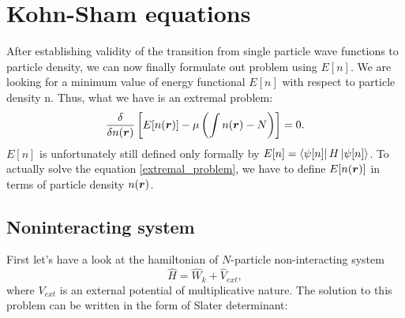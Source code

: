 \documentclass[openany, longbibliography,slovene,a4paper,12pt]{article}
\def\vec#1{\mbox{\boldmath$#1$}}
\begin{document}
  \section{Kohn-Sham equations}
After establishing validity of the transition from single particle wave functions
to particle density, we can now finally formulate out problem using $E[n]$. We
are looking for a minimum value of energy functional $E[n]$ with respect to particle
density n. Thus, what we have is an extremal problem: 
\begin{equation} \label{extremal_problem}
  \frac{\delta }{\delta n(\vec r)} \left[  E[n(\vec r)] - \mu \left(  \int n(\vec r) -N \right)  \right] =0.
  \end{equation}
 $E[n]$ is unfortunately still defined only formally by
 $E[n]=\bra{\psi[n]}H\ket{\psi[n]}$. To actually solve the equation
 \ref{extremal_problem}, we have to define $E[n(\vec r)]$ in terms of particle density
 $n(\vec r)$.
 
\subsection{Noninteracting system}
 First let's have a look at the hamiltonian of $N$-particle non-interacting system
 \begin{equation} \label{noninteracting_H}
   \hat H =\hat  W_k + \hat V_{ext}, 
 \end{equation}
 where $V_{ext}$ is an external potential of multiplicative nature. The solution
 to this problem can be written in the form of Slater determinant:
\end{document}
